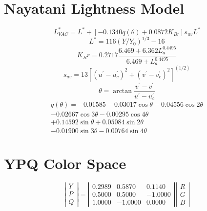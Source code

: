 \documentclass{article}
\begin{document}

\appendix
\section{Nayatani Lightness Model}
\cite{Nayatani98}
\begin{equation}
L^*_{VAC} = L^* + [-0.1340 q(\theta) + 0.0872 K_{Br}] s_{uv} L^*
\end{equation}
\begin{equation}
L^* = 116(Y / Y_0)^{1/3} - 16
\end{equation}
\begin{equation}
K_Br = 0.2717 \frac{6.469 + 6.362L_a^{0.4495}}{6.469 + L^{0.4495}_a}
\end{equation}
\begin{equation}
s_{uv} = 13 [(u^{'} - u^{'}_c)^2 +(v^{'} - v^{'}_c)^2]^(1/2)
\end{equation}
\begin{equation}
\theta = \arctan{ \frac{  v^{'} - v^{'} }{u^{'} - u^{'}_c } }
\end{equation}
\begin{eqnarray}
q(\theta) = -0.01585 - 0.03017 \cos\theta - 0.04556 \cos2\theta \\ - 0.02667\cos3\theta - 0.00295\cos4\theta\\ + 0.14592\sin\theta + 0.05084\sin2\theta\\ - 0.01900\sin3\theta - 0.00764\sin4\theta
\end{eqnarray}

\section{YPQ Color Space}
\cite{journals/pr/GrundlandD07} 
\begin{equation}
\left| \begin{array}{c} Y \\ P \\ Q \end{array} \right| = 
\left| \begin{array}{ccc}
0.2989 & 0.5870 & 0.1140 \\
0.5000 & 0.5000 & -1.0000\\
1.0000 & -1.0000&  0.0000
\end{array} \right|
\left|\begin{array}{c} R \\ G \\ B \end{array} \right|
\end{equation}





\end{document}
